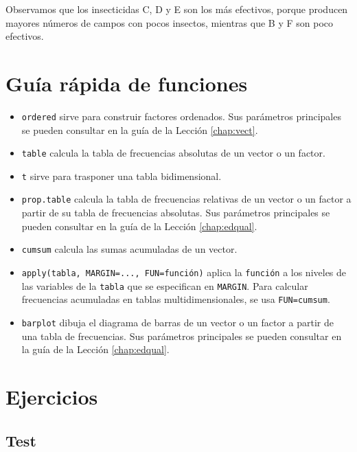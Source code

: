\documentclass[
]{book}
\theoremstyle{definition}
\theoremstyle{definition}
\theoremstyle{definition}
\theoremstyle{remark}
\begin{document}
Observamos que los insecticidas C, D y E son los más efectivos, porque producen mayores números de campos con pocos insectos, mientras que B y F son poco efectivos.

\hypertarget{guuxeda-ruxe1pida-de-funciones-5}{%
\section{Guía rápida de funciones}\label{guuxeda-ruxe1pida-de-funciones-5}}

\begin{itemize}
\item
  \texttt{ordered} sirve para construir factores ordenados. Sus parámetros principales se pueden consultar en la guía de la Lección \ref{chap:vect}.
\item
  \texttt{table} calcula la tabla de frecuencias absolutas de un vector o un factor.
\item
  \texttt{t} sirve para trasponer una tabla bidimensional.
\item
  \texttt{prop.table} calcula la tabla de frecuencias relativas de un vector o un factor a partir de su tabla de frecuencias absolutas. Sus parámetros principales se pueden consultar en la guía de la Lección \ref{chap:edqual}.
\item
  \texttt{cumsum} calcula las sumas acumuladas de un vector.
\item
  \texttt{apply(tabla,\ MARGIN=...,\ FUN=función)} aplica la \texttt{función} a
  los niveles de las variables de la \texttt{tabla} que se especifican en \texttt{MARGIN}. Para calcular frecuencias acumuladas en tablas multidimensionales, se usa \texttt{FUN=cumsum}.
\item
  \texttt{barplot} dibuja el diagrama de barras de un vector o un factor a partir de una tabla de frecuencias. Sus parámetros principales se pueden consultar en la guía de la Lección \ref{chap:edqual}.
\end{itemize}

\hypertarget{ejercicios-9}{%
\section{Ejercicios}\label{ejercicios-9}}

\hypertarget{test-8}{%
\subsection*{Test}\label{test-8}}
\end{document}
